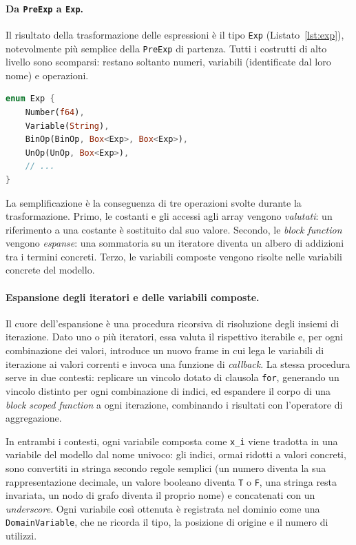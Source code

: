 \paragraph{Da \texttt{PreExp} a \texttt{Exp}.}
Il risultato della trasformazione delle espressioni è il tipo \texttt{Exp}
(Listato~\ref{lst:exp}), notevolmente più semplice della \texttt{PreExp} di
partenza. Tutti i costrutti di alto livello sono scomparsi: restano soltanto
numeri, variabili (identificate dal loro nome) e operazioni.

\begin{lstlisting}[language=rust, caption={Versione semplificata dell'enumerazione \texttt{Exp}.}, label={lst:exp}]
enum Exp {
    Number(f64),
    Variable(String),
    BinOp(BinOp, Box<Exp>, Box<Exp>),
    UnOp(UnOp, Box<Exp>),
    // ...
}
\end{lstlisting}

La semplificazione è la conseguenza di tre operazioni svolte durante la
trasformazione. Primo, le costanti e gli accessi agli array vengono
\emph{valutati}: un riferimento a una costante è sostituito dal suo valore.
Secondo, le \emph{block function} vengono \emph{espanse}: una sommatoria su un
iteratore diventa un albero di addizioni tra i termini concreti. Terzo, le variabili composte vengono risolte nelle
variabili concrete del modello.

\paragraph{Espansione degli iteratori e delle variabili composte.}
Il cuore dell'espansione è una procedura ricorsiva di risoluzione degli insiemi
di iterazione. Dato uno o più iteratori, essa valuta il rispettivo iterabile e,
per ogni combinazione dei valori, introduce un nuovo frame in cui lega le
variabili di iterazione ai valori correnti e invoca una funzione di
\emph{callback}. La stessa procedura serve in due contesti: replicare un vincolo
dotato di clausola \texttt{for}, generando un vincolo distinto per ogni
combinazione di indici, ed espandere il corpo di una \emph{block scoped function}
a ogni iterazione, combinando i risultati con l'operatore di aggregazione.

In entrambi i contesti, ogni variabile composta come \texttt{x\_i} viene tradotta
in una variabile del modello dal nome univoco: gli indici, ormai ridotti a valori
concreti, sono convertiti in stringa secondo regole semplici (un numero diventa la
sua rappresentazione decimale, un valore booleano diventa \texttt{T} o \texttt{F},
una stringa resta invariata, un nodo di grafo diventa il proprio nome) e
concatenati con un \emph{underscore}. Ogni variabile così ottenuta è registrata nel
dominio come una \texttt{DomainVariable}, che ne ricorda il tipo, la posizione di
origine e il numero di utilizzi.

